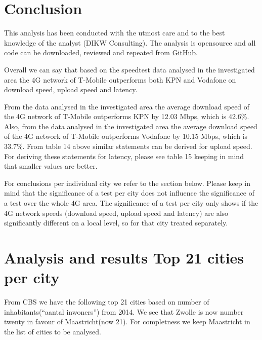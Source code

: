 \documentclass[]{article}
\begin{document}
\newpage

\section{Conclusion}\label{conclusion}

This analysis has been conducted with the utmost care and to the best
knowledge of the analyst (DIKW Consulting). The analysis is opensource
and all code can be downloaded, reviewed and repeated from
\href{https://github.com/hugokoopmans/ookla-speedtest-analysis}{GitHub}.

Overall we can say that based on the speedtest data analysed in the
investigated area the 4G network of T-Mobile outperforms both KPN and
Vodafone on download speed, upload speed and latency.

From the data analysed in the investigated area the average download
speed of the 4G network of T-Mobile outperforms KPN by 12.03 Mbps, which
is 42.6\%. Also, from the data analysed in the investigated area the
average download speed of the 4G network of T-Mobile outperforms
Vodafone by 10.15 Mbps, which is 33.7\%. From table 14 above similar
statements can be derived for upload speed. For deriving these
statements for latency, please see table 15 keeping in mind that smaller
values are better.

For conclusions per individual city we refer to the section below.
Please keep in mind that the significance of a test per city does not
influence the significance of a test over the whole 4G area. The
significance of a test per city only shows if the 4G network speeds
(download speed, upload speed and latency) are also significantly
different on a local level, so for that city treated separately.

\newpage

\section{Analysis and results Top 21 cities per
city}\label{analysis-and-results-top-21-cities-per-city}

From CBS we have the following top 21 cities based on number of
inhabitants(``aantal inwoners'') from 2014. We see that Zwolle is now
number twenty in favour of Maastricht(now 21). For completness we keep
Maastricht in the list of cities to be analysed.
\end{document}
